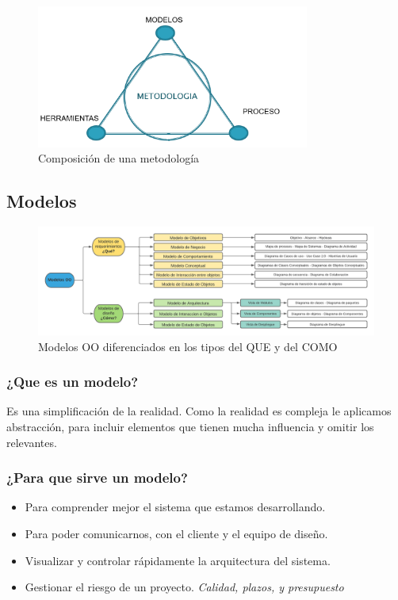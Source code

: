 \documentclass[titlepage,a4paper]{article}
\begin{document}
    \begin{figure}[!htb]
        \centering
        \includegraphics[width=0.8\textwidth]{Imagenes/Metodologias.png}
        \caption{Composición de una metodología}
    \end{figure}

\subsection{Modelos}


\begin{figure}[!htb]
    \centering
    \hspace*{-2.8cm}
    \includegraphics[width=1.3\textwidth]{Imagenes/ModelosOO.png}
    \caption{Modelos OO diferenciados en los tipos del QUE y del COMO}
\end{figure}

\subsubsection*{¿Que es un modelo?}
Es una simplificación de la realidad. Como la realidad es compleja le aplicamos abstracción, para incluir elementos que tienen mucha influencia y omitir los relevantes.

\subsubsection*{¿Para que sirve un modelo?}
    \begin{itemize}
        \item Para comprender mejor el sistema que estamos desarrollando.
        \item Para poder comunicarnos, con el cliente y el equipo de diseño.
        \item Visualizar y controlar rápidamente la arquitectura del sistema.
        \item Gestionar el riesgo de un proyecto. \textit{Calidad, plazos, y presupuesto}
    \end{itemize}
\end{document}
